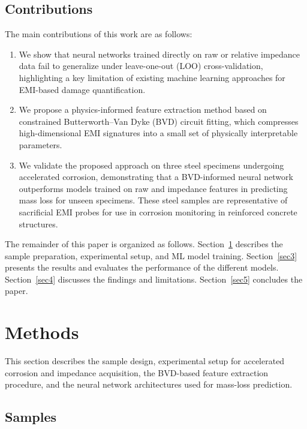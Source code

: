 \documentclass[journal,twoside,web]{ieeecolor}
\begin{document}
\subsection{Contributions}

The main contributions of this work are as follows:
\begin{enumerate}
    \item We show that neural networks trained directly on raw or relative impedance data fail to generalize under leave-one-out (LOO) cross-validation, highlighting a key limitation of existing machine learning approaches for EMI-based damage quantification.
    
    \item We propose a physics-informed feature extraction method based on constrained Butterworth–Van Dyke (BVD) circuit fitting, which compresses high-dimensional EMI signatures into a small set of physically interpretable parameters.
    
    \item We validate the proposed approach on three steel specimens undergoing accelerated corrosion, demonstrating that a BVD-informed neural network outperforms models trained on raw and impedance features in predicting mass loss for unseen specimens. These steel samples are representative of sacrificial EMI probes for use in corrosion monitoring in reinforced concrete structures.
\end{enumerate}

The remainder of this paper is organized as follows. Section~\ref{sec2} describes the sample preparation, experimental setup, and ML model training. Section~\ref{sec3} presents the results and evaluates the performance of the different models. Section~\ref{sec4} discusses the findings and limitations. Section~\ref{sec5} concludes the paper.


\section{Methods}\label{sec2}

This section describes the sample design, experimental setup for accelerated corrosion and impedance acquisition, the BVD-based feature extraction procedure, and the neural network architectures used for mass-loss prediction.

\subsection{Samples}
\end{document}
